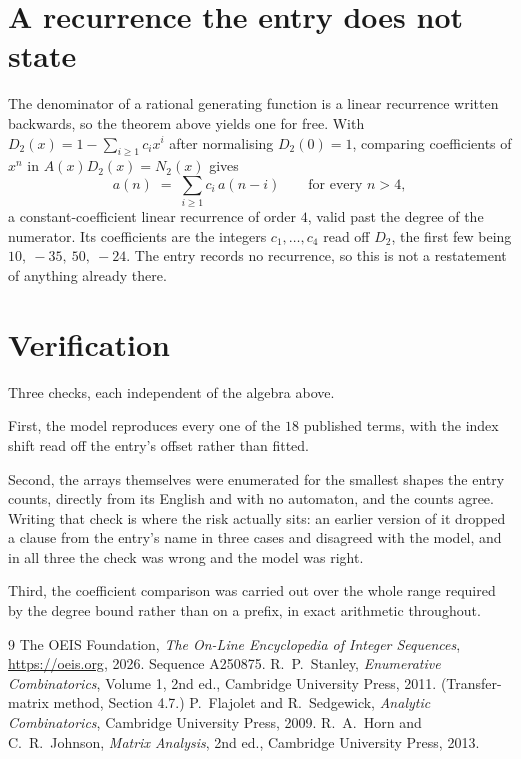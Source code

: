 \documentclass[11pt,a4paper]{article}
\theoremstyle{plain}
\theoremstyle{definition}
\begin{document}
\section{A recurrence the entry does not state}

The denominator of a rational generating function is a linear recurrence written backwards, so
the theorem above yields one for free. With $D_2(x)=1-\sum_{i\ge1}c_ix^i$ after normalising
$D_2(0)=1$, comparing coefficients of $x^n$ in $A(x)D_2(x)=N_2(x)$ gives
\[
a(n)\;=\;\sum_{i\ge1}c_i\,a(n-i)\qquad\text{for every }n>4,
\]
a constant-coefficient linear recurrence of order $4$, valid past the degree of the
numerator. Its coefficients are the integers $c_1,\dots,c_{4}$ read off $D_2$, the first few being $10,\ -35,\ 50,\ -24$. The entry records no recurrence, so this is not a restatement of anything
already there.

\section{Verification}

Three checks, each independent of the algebra above.

First, the model reproduces every one of the $18$ published terms, with the index shift
read off the entry's offset rather than fitted.

Second, the arrays themselves were enumerated for the smallest shapes the entry counts,
directly from its English and with no automaton, and the counts agree. Writing that check is
where the risk actually sits: an earlier version of it dropped a clause from the entry's name
in three cases and disagreed with the model, and in all three the check was wrong and the model
was right.

Third, the coefficient comparison was carried out over the whole range required by the degree
bound rather than on a prefix, in exact arithmetic throughout.

\begin{thebibliography}{9}
 The OEIS Foundation, \emph{The On-Line Encyclopedia of Integer
Sequences}, \url{https://oeis.org}, 2026. Sequence A250875.
 R.~P.~Stanley, \emph{Enumerative Combinatorics}, Volume 1, 2nd ed.,
Cambridge University Press, 2011. (Transfer-matrix method, Section 4.7.)
 P.~Flajolet and R.~Sedgewick, \emph{Analytic Combinatorics}, Cambridge
University Press, 2009.
 R.~A.~Horn and C.~R.~Johnson, \emph{Matrix Analysis}, 2nd ed., Cambridge
University Press, 2013.
\end{thebibliography}
\end{document}

